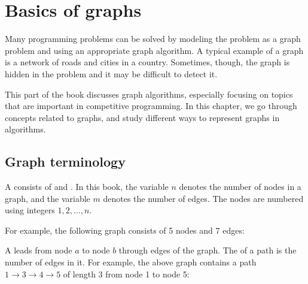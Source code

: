 \chapter{Basics of graphs}

Many programming problems can be solved by
modeling the problem as a graph problem
and using an appropriate graph algorithm.
A typical example of a graph is a network
of roads and cities in a country.
Sometimes, though, the graph is hidden
in the problem and it may be difficult to detect it.

This part of the book discusses graph algorithms,
especially focusing on topics that
are important in competitive programming.
In this chapter, we go through concepts
related to graphs,
and study different ways to represent graphs in algorithms.

\section{Graph terminology}


A  consists of 
and . In this book,
the variable $n$ denotes the number of nodes
in a graph, and the variable $m$ denotes
the number of edges.
The nodes are numbered
using integers $1,2,\ldots,n$.

For example, the following graph consists of 5 nodes and 7 edges:

\begin{center}
\end{center}


A  leads from node $a$ to node $b$
through edges of the graph.
The  of a path is the number of
edges in it.
For example, the above graph contains
a path $1 \rightarrow 3 \rightarrow 4 \rightarrow 5$
of length 3
from node 1 to node 5:

